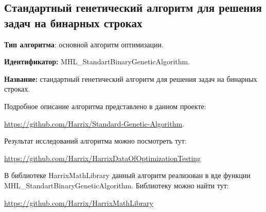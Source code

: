 \subsection{Стандартный генетический алгоритм для решения задач на бинарных строках}\label{HarrixOptimizationAlgorithms:MHL_StandartBinaryGeneticAlgorithm}

\textbf{Тип алгоритма}: основной алгоритм оптимизации.

\textbf{Идентификатор:} MHL\_StandartBinaryGeneticAlgorithm.

\textbf{Название:} стандартный генетический алгоритм для решения задач на бинарных строках.

Подробное описание алгоритма представлено в данном проекте: 

\href{https://github.com/Harrix/Standard-Genetic-Algorithm}{https://github.com/Harrix/Standard-Genetic-Algorithm}. 

Результат исследований алгоритма можно посмотреть тут:

\href{https://github.com/Harrix/HarrixDataOfOptimizationTesting}{https://github.com/Harrix/HarrixDataOfOptimizationTesting}

В библиотеке HarrixMathLibrary данный алгоритм реализован в вде функции MHL\_StandartBinaryGeneticAlgorithm. Библиотеку можно найти тут:

\href{https://github.com/Harrix/HarrixMathLibrary}{https://github.com/Harrix/HarrixMathLibrary}